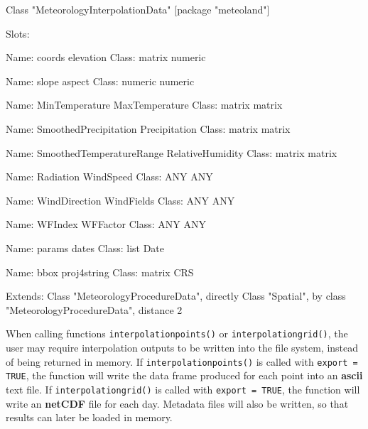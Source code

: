 \documentclass[11pt,a4paper]{article}
\begin{document}
\begin{Schunk}
\begin{Soutput}
Class "MeteorologyInterpolationData" [package "meteoland"]

Slots:
                                                        
Name:                    coords                elevation
Class:                   matrix                  numeric
                                                        
Name:                     slope                   aspect
Class:                  numeric                  numeric
                                                        
Name:            MinTemperature           MaxTemperature
Class:                   matrix                   matrix
                                                        
Name:     SmoothedPrecipitation            Precipitation
Class:                   matrix                   matrix
                                                        
Name:  SmoothedTemperatureRange         RelativeHumidity
Class:                   matrix                   matrix
                                                        
Name:                 Radiation                WindSpeed
Class:                      ANY                      ANY
                                                        
Name:             WindDirection               WindFields
Class:                      ANY                      ANY
                                                        
Name:                   WFIndex                 WFFactor
Class:                      ANY                      ANY
                                                        
Name:                    params                    dates
Class:                     list                     Date
                                                        
Name:                      bbox              proj4string
Class:                   matrix                      CRS

Extends: 
Class "MeteorologyProcedureData", directly
Class "Spatial", by class "MeteorologyProcedureData", distance 2
\end{Soutput}
\end{Schunk}
When calling functions \texttt{interpolationpoints()} or \texttt{interpolationgrid()}, the user may require interpolation outputs to be written into the file system, instead of being returned in memory. If \texttt{interpolationpoints()} is called with \texttt{export = TRUE}, the function will write the data frame produced for each point into an \textbf{ascii} text file. If \texttt{interpolationgrid()} is called with \texttt{export = TRUE}, the function will write an \textbf{netCDF} file for each day. Metadata files will also be written, so that results can later be loaded in memory.
\end{document}
